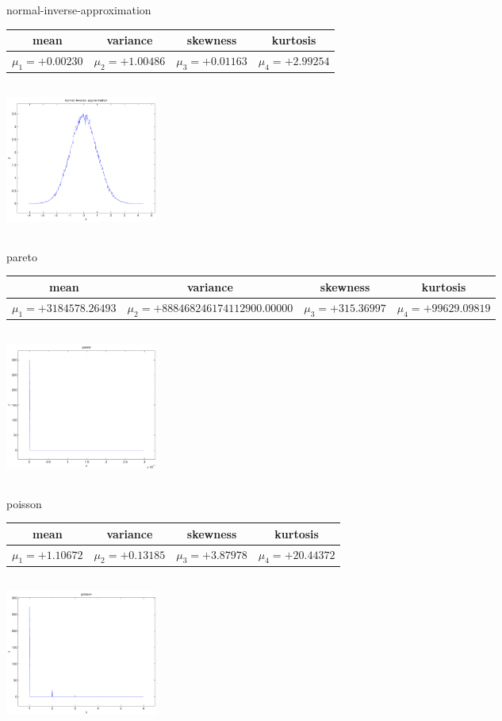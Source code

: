 \documentclass[9pt]{article}
\theoremstyle{plain}
\theoremstyle{definition}
\theoremstyle{remark}
\numberwithin{equation}{section}
\begin{document}
\newpage
normal-inverse-approximation \begin{tabular}{|c|c|c|c|}  mean & variance & skewness & kurtosis \\  \hline
$\mu_1 = +0.00230$ & $\mu_2 = +1.00486$ & $\mu_3 = +0.01163$ & $\mu_4 =+2.99254$ \\
\end{tabular}

\includegraphics[width=5cm,height=5cm]{normal-inverse-approximation.pdf}

pareto \begin{tabular}{|c|c|c|c|}  mean & variance & skewness & kurtosis \\  \hline
$\mu_1 = +3184578.26493$ & $\mu_2 = +888468246174112900.00000$ & $\mu_3 = +315.36997$ & $\mu_4 =+99629.09819$ \\
\end{tabular}

\includegraphics[width=5cm,height=5cm]{pareto.pdf}

poisson \begin{tabular}{|c|c|c|c|}  mean & variance & skewness & kurtosis \\  \hline
$\mu_1 = +1.10672$ & $\mu_2 = +0.13185$ & $\mu_3 = +3.87978$ & $\mu_4 =+20.44372$ \\
\end{tabular}

\includegraphics[width=5cm,height=5cm]{poisson.pdf}
\end{document}
